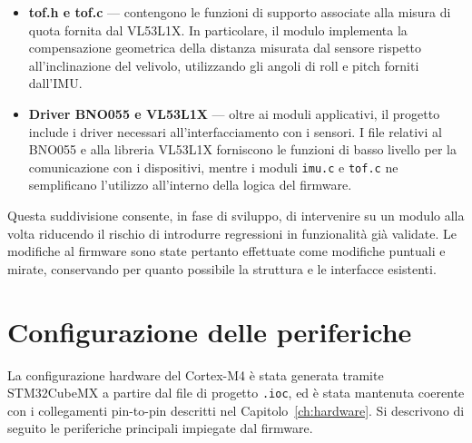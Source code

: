 \documentclass[11pt]{report}
\begin{document}
\begin{itemize}
    \item \textbf{tof.h e tof.c} — contengono le funzioni di supporto associate alla misura di quota fornita dal VL53L1X. In particolare, il modulo implementa la compensazione geometrica della distanza misurata dal sensore rispetto all'inclinazione del velivolo, utilizzando gli angoli di roll e pitch forniti dall'IMU.

    \item \textbf{Driver BNO055 e VL53L1X} — oltre ai moduli applicativi, il progetto include i driver necessari all'interfacciamento con i sensori. I file relativi al BNO055 e alla libreria VL53L1X forniscono le funzioni di basso livello per la comunicazione con i dispositivi, mentre i moduli \texttt{imu.c} e \texttt{tof.c} ne semplificano l'utilizzo all'interno della logica del firmware.
\end{itemize}

Questa suddivisione consente, in fase di sviluppo, di intervenire su un modulo alla volta riducendo il rischio di introdurre regressioni in funzionalità già validate. Le modifiche al firmware sono state pertanto effettuate come modifiche puntuali e mirate, conservando per quanto possibile la struttura e le interfacce esistenti.

\section{Configurazione delle periferiche}
La configurazione hardware del Cortex-M4 è stata generata tramite STM32CubeMX a partire dal file di progetto \texttt{.ioc}, ed è stata mantenuta coerente con i collegamenti pin-to-pin descritti nel Capitolo~\ref{ch:hardware}. Si descrivono di seguito le periferiche principali impiegate dal firmware.
\end{document}
